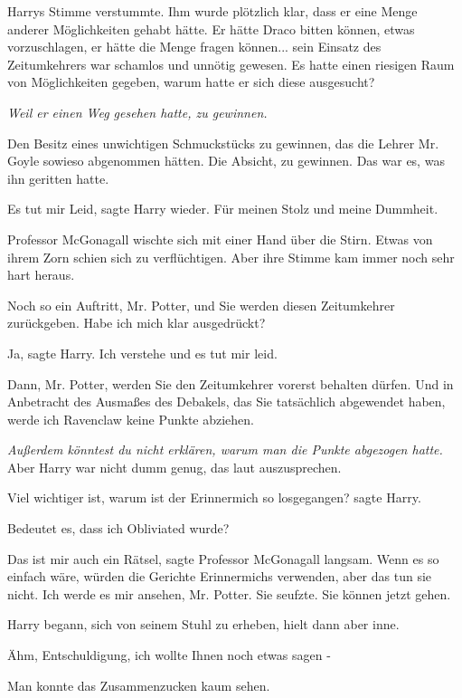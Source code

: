 Harrys Stimme verstummte. Ihm wurde plötzlich klar, dass er eine Menge anderer
Möglichkeiten gehabt hätte. Er hätte Draco bitten können, etwas vorzuschlagen,
er hätte die Menge fragen können... sein Einsatz des Zeitumkehrers war schamlos
und unnötig gewesen. Es hatte einen riesigen Raum von Möglichkeiten gegeben,
warum hatte er sich diese ausgesucht?

\emph{Weil er einen Weg gesehen hatte, zu gewinnen.}

Den Besitz eines unwichtigen Schmuckstücks zu gewinnen, das die Lehrer Mr. Goyle
sowieso abgenommen hätten. Die Absicht, zu gewinnen. Das war es, was ihn
geritten hatte.

\glqq Es tut mir Leid\grqq{}, sagte Harry wieder. \glqq Für meinen Stolz und
meine Dummheit.\grqq{}

Professor McGonagall wischte sich mit einer Hand über die Stirn. Etwas von ihrem
Zorn schien sich zu verflüchtigen. Aber ihre Stimme kam immer noch sehr hart
heraus.

\glqq Noch so ein Auftritt, Mr. Potter, und Sie werden diesen Zeitumkehrer
zurückgeben. Habe ich mich klar ausgedrückt?\grqq{}

\glqq Ja\grqq{}, sagte Harry. \glqq Ich verstehe und es tut mir leid.\grqq{}

\glqq Dann, Mr. Potter, werden Sie den Zeitumkehrer vorerst behalten dürfen. Und
in Anbetracht des Ausmaßes des Debakels, das Sie tatsächlich abgewendet haben,
werde ich Ravenclaw keine Punkte abziehen.\grqq{}

\emph{Außerdem könntest du nicht erklären, warum man die Punkte abgezogen
hatte.} Aber Harry war nicht dumm genug, das laut auszusprechen.

\glqq Viel wichtiger ist, warum ist der Erinnermich so losgegangen?\grqq{} sagte
Harry.

\glqq Bedeutet es, dass ich Obliviated wurde?\grqq{}

\glqq Das ist mir auch ein Rätsel\grqq{}, sagte Professor McGonagall langsam.
\glqq Wenn es so einfach wäre, würden die Gerichte Erinnermichs verwenden, aber
das tun sie nicht. Ich werde es mir ansehen, Mr. Potter.\grqq{} Sie seufzte.
\glqq Sie können jetzt gehen.\grqq{}

Harry begann, sich von seinem Stuhl zu erheben, hielt dann aber inne.

\glqq Ähm, Entschuldigung, ich wollte Ihnen noch etwas sagen -\grqq{}

Man konnte das Zusammenzucken kaum sehen.

